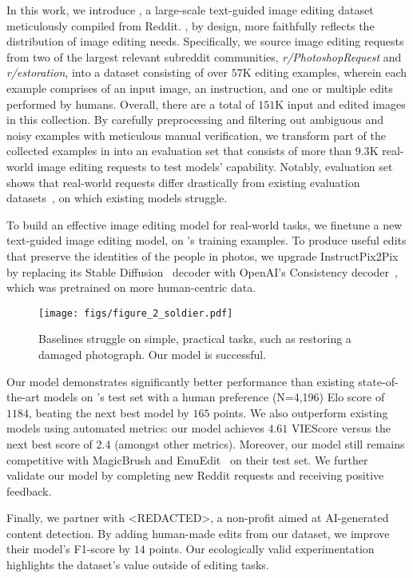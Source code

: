 In this work, we introduce \ours, a large-scale text-guided image editing dataset meticulously compiled from Reddit. \ours, by design, more faithfully reflects the distribution of image editing needs.
Specifically, we source image editing requests from two of the largest relevant subreddit communities, \textit{r/PhotoshopRequest} and \textit{r/estoration}, into a dataset consisting of over $57$K editing examples, wherein each example comprises of an input image, an instruction, and one or multiple edits performed by humans. Overall, there are a total of $151$K input and edited images in this collection.
By carefully preprocessing and filtering out ambiguous and noisy examples with meticulous manual verification, we transform part of the collected examples in \ours into an evaluation set that consists of more than $9.3$K real-world image editing requests to test models' capability.
Notably, \ours evaluation set shows that real-world requests differ drastically from existing evaluation datasets~\cite{zhang2024magicbrush, sheynin2024emu}, on which existing models struggle.

To build an effective image editing model for real-world tasks, we finetune a new text-guided image editing model, on \ours's training examples. To produce useful edits that preserve the identities of the people in photos, we upgrade InstructPix2Pix~\cite{brooks2023instructpix2pix} by replacing its Stable Diffusion~\cite{rombach2022high} decoder with OpenAI's Consistency decoder~\cite{openai_consistencydecoder}, which was pretrained on more human-centric data.


\begin{figure*}[!h]
    \centering
    \texttt{[image: figs/figure\_2\_soldier.pdf]}
    \caption{Baselines struggle on simple, practical tasks, such as restoring a damaged photograph. Our model is successful.}
    \label{fig:soldier}
\end{figure*}



Our model demonstrates significantly better performance than existing state-of-the-art models on \ours's test set with a human preference (N=4,196) Elo score of $1184$, beating the next best model by $165$ points. We also outperform existing models using automated metrics: our model achieves $4.61$ VIEScore versus the next best score of $2.4$ (amongst other metrics).
Moreover, our model still remains competitive with MagicBrush and EmuEdit~\cite{zhang2024magicbrush, sheynin2024emu} on their test set. We further validate our model by completing new Reddit requests and receiving positive feedback.

Finally, we partner with \textless{}REDACTED\textgreater{}, a non-profit aimed at AI-generated content detection. By adding human-made edits from our dataset, we improve their model's F1-score by $14$ points. Our ecologically valid experimentation highlights the dataset's value outside of editing tasks.
